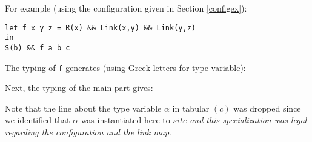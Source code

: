 \documentclass[10pt,a4paper]{article}
\newcommand{\ocaml}{\texttt}
\begin{document}
For example (using the configuration given in Section \ref{configex}):
\begin{verbatim}
let f x y z = R(x) && Link(x,y) && Link(y,z)
in
S(b) && f a b c
\end{verbatim}
The typing of \ocaml{f} generates (using Greek letters for type variable):\\

\begin{figure}[H]
  \centering
  \quad\quad
\end{figure}

Next, the typing of the main part gives:
\begin{figure}[H]
  \centering
  \quad\quad
  \quad\quad
\end{figure}

Note that the line about the type variable $\alpha$ in tabular $(c)$ was dropped since we identified that $\alpha$ was instantiated here to $site$ \emph{and this specialization was legal regarding the configuration and the link map}.
\end{document}
